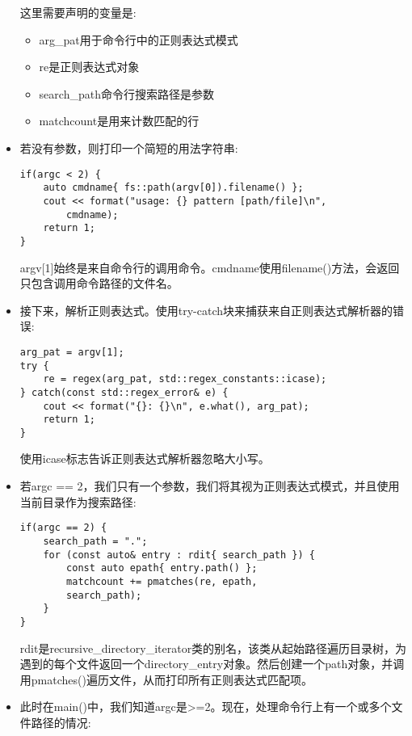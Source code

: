 \begin{itemize}
这里需要声明的变量是:

\begin{itemize}
\item
arg\_pat用于命令行中的正则表达式模式

\item
re是正则表达式对象

\item
search\_path命令行搜索路径是参数

\item
matchcount是用来计数匹配的行
\end{itemize}

\item 
若没有参数，则打印一个简短的用法字符串:

\begin{lstlisting}[style=styleCXX]
if(argc < 2) {
	auto cmdname{ fs::path(argv[0]).filename() };
	cout << format("usage: {} pattern [path/file]\n",
		cmdname);
	return 1;
}
\end{lstlisting}

argv[1]始终是来自命令行的调用命令。cmdname使用filename()方法，会返回只包含调用命令路径的文件名。

\item 
接下来，解析正则表达式。使用try-catch块来捕获来自正则表达式解析器的错误:

\begin{lstlisting}[style=styleCXX]
arg_pat = argv[1];
try {
	re = regex(arg_pat, std::regex_constants::icase);
} catch(const std::regex_error& e) {
	cout << format("{}: {}\n", e.what(), arg_pat);
	return 1;
}
\end{lstlisting}

使用icase标志告诉正则表达式解析器忽略大小写。

\item 
若argc == 2，我们只有一个参数，我们将其视为正则表达式模式，并且使用当前目录作为搜索路径:

\begin{lstlisting}[style=styleCXX]
if(argc == 2) {
	search_path = ".";
	for (const auto& entry : rdit{ search_path }) {
		const auto epath{ entry.path() };
		matchcount += pmatches(re, epath,
		search_path);
	}
}
\end{lstlisting}

rdit是recursive\_directory\_iterator类的别名，该类从起始路径遍历目录树，为遇到的每个文件返回一个directory\_entry对象。然后创建一个path对象，并调用pmatches()遍历文件，从而打印所有正则表达式匹配项。

\item 
此时在main()中，我们知道argc是>=2。现在，处理命令行上有一个或多个文件路径的情况:


\end{itemize}
